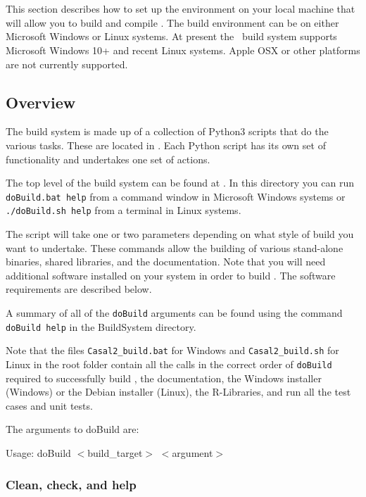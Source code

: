 \section{}\label{sec:build_environment}

This section describes how to set up the environment on your local machine that will allow you to build and compile \CNAME. The build environment can be on either Microsoft Windows or Linux systems. At present the \CNAME\ build system supports Microsoft Windows 10+ and recent Linux systems. Apple OSX or other platforms are not currently supported.

\subsection{Overview}

The build system is made up of a collection of Python3 scripts that do the various tasks. These are located in . Each Python script has its own set of functionality and undertakes one set of actions.

The top level of the build system can be found at . In this directory you can run \texttt{doBuild.bat help} from a command window in Microsoft Windows systems or \texttt{./doBuild.sh help} from a terminal in Linux systems.

The script will take one or two parameters depending on what style of build you want to undertake. These commands allow the building of various stand-alone binaries, shared libraries, and the documentation. Note that you will need additional software installed on your system in order to build \CNAME.  The software requirements are described below.

A summary of all of the \texttt{doBuild} arguments can be found using the command \texttt{doBuild help} in the BuildSystem directory.

Note that the files \texttt{Casal2\_build.bat} for Windows and \texttt{Casal2\_build.sh} for Linux in the root folder contain all the calls in the correct order of \texttt{doBuild} required to successfully build \CNAME, the documentation, the Windows installer (Windows) or the Debian installer (Linux), the R-Libraries, and run all the test cases and unit tests.

The arguments to doBuild are:

Usage: doBuild $<$build\_target$>$ $<$argument$>$

\subsubsection*{Clean, check, and help}
	
